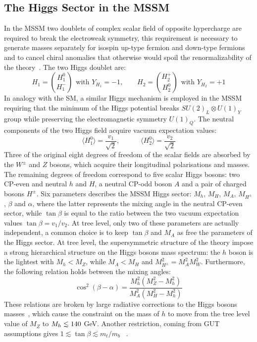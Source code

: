 \subsection{The Higgs Sector in the MSSM }\label{sec:hsector}
In the MSSM two doublets of complex scalar field of opposite hypercharge are required to break the electroweak symmetry, 
this requirement is necessary to generate masses separately for isospin up-type fermion and down-type fermions~\cite{Susy2,Higgsm1,Higgsm2}
and to cancel chiral anomalies that otherwise would spoil the renormalizability of the theory~\cite{Higgsm3}. The two Higgs doublet  are:
\begin{equation}
H_1 = \binom{H_1^0}{H_1^-} ~ ~ \text{with } Y_{H_1} = -1, \quad \quad H_2 = \binom{H_2^+}{H_2^0} ~ ~ \text{with } Y_{H_2} = +1  
\end{equation}
In analogy with the SM, a similar Higgs mechanism is employed in the MSSM~\cite{MSSM1,Higgsm4}  requiring that the minimum 
of the Higgs potential breaks $SU(2)_L \otimes U(1)_Y$ group while preserving the electromagnetic symmetry $U(1)_Q$.
The neutral components of the 
two Higgs field acquire vacuum expectation values:
\begin{equation}
\langle H_1^0 \rangle = \frac{v_1}{\sqrt{2}}, \quad \quad \quad  \langle H_2^0 \rangle = \frac{v_2}{\sqrt{2}}
\end{equation}
Three of the original eight degrees of freedom of the scalar fields are absorbed by the $W^{\pm}$ and $Z$ bosons, which acquire
their longitudinal polarisations and masses. The remaining degrees of freedom correspond to five scalar Higgs bosons: two CP-even and neutral $h$ and $H$, 
a neutral CP-odd boson $A$ and a pair of charged bosons $H^{\pm}$. Six parameters describes the MSSM Higgs sector: $M_h$, $M_H$, $M_A$, $M_{H^\pm}$,
$\beta$ and $\alpha$, where the latter represents the mixing angle in the neutral CP-even sector, while $\tan \beta $ is equal to the 
ratio between the two vacuum expectation values $\tan \beta = v_1/v_2$.
At tree level,  only two of these parameters  are actually independent, a common choice is to keep $\tan \beta$ and $M_A$ as free the parameters of the Higgs sector. 
At tree level, the supersymmetric structure of the theory impose a strong hierarchical structure on the Higgs bosons mass spectrum: 
the $h$ boson is the lightest with  $M_h < M_Z$, while $M_A < M_H$ and $M_{H^\pm}^2 = M_A^2 M_W^2$. Furthermore, the 
following relation holds between the mixing angles:
\begin{equation}\label{eq:mixing}
\cos^2(\beta - \alpha) = \frac{M_h^2 (M_Z^2 - M_h^2)}{M_A^2 (M_H^2 - M_h^2)}
\end{equation}
These relations are broken by large radiative corrections to the Higgs bosons 
masses~\cite{Higgsm5}, which cause the constraint on the mass of $h$ to move from the tree level value of $M_Z$ to $\mh \apprle 140$ GeV.
Another restriction, coming from GUT assumptions gives $1 \apprle \tan \beta \apprle m_t/m_b$ ~\cite{Higgsm6}.


